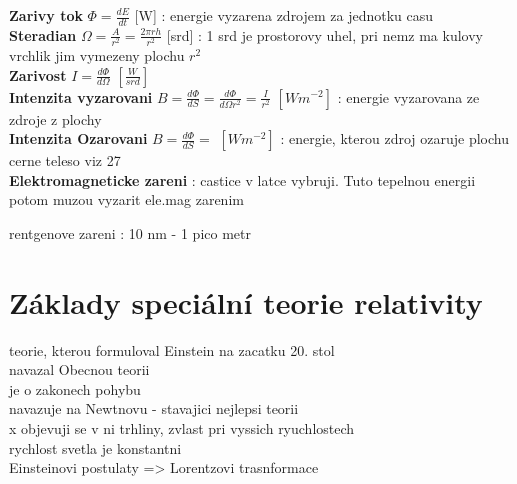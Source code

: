 \documentclass{report}
\begin{document}
\textbf{Zarivy tok} $\Phi=\frac{dE}{dt}$ [W] : energie vyzarena zdrojem za jednotku casu \\
\textbf{Steradian} $\Omega=\frac{A}{r^2}=\frac{2\pi rh}{r^2}$ [srd] : 1 srd je prostorovy uhel, pri nemz ma kulovy vrchlik jim vymezeny plochu $r^2$ \\
\textbf{Zarivost} $I=\frac{d \Phi}{d \Omega}$ $[\frac{W}{srd}]$ \\
\textbf{Intenzita vyzarovani} $B=\frac{d\Phi}{dS}=\frac{d \Phi}{d\Omega r^2}=\frac{I}{r^2}$ $[Wm^{-2}]$ : energie vyzarovana ze zdroje z plochy \\
\textbf{Intenzita Ozarovani} $B=\frac{d\Phi}{dS}=$ $[Wm^{-2}]$ : energie, kterou zdroj ozaruje plochu \\

cerne teleso viz  27 \\
\textbf{Elektromagneticke zareni} : castice v latce vybruji. Tuto tepelnou energii potom muzou vyzarit ele.mag zarenim \\

rentgenove zareni : 10 nm - 1 pico metr

\newpage


\section{Základy speciální teorie relativity}

\vspace{0.5cm}
teorie, kterou formuloval Einstein na zacatku 20. stol \\
navazal Obecnou teorii \\
je o zakonech pohybu \\
navazuje na Newtnovu - stavajici nejlepsi teorii \\
x objevuji se v ni trhliny, zvlast pri vyssich ryuchlostech \\
rychlost svetla je konstantni \\
Einsteinovi postulaty => Lorentzovi trasnformace \\
\end{document}
